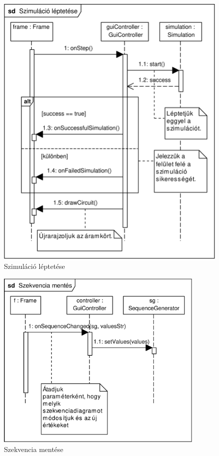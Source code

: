 \begin{figure}[h]
\begin{center}
\includegraphics[width=15cm]{chapters/chapter11/pdfs/7_step.pdf}
\caption{Szimuláció léptetése}
\label{fig:step}
\end{center}
\end{figure}

\begin{figure}[h]
\begin{center}
\includegraphics[width=10cm]{chapters/chapter11/pdfs/8_newsequence.pdf}
\caption{Szekvencia mentése}
\label{fig:newsequence}
\end{center}
\end{figure}

